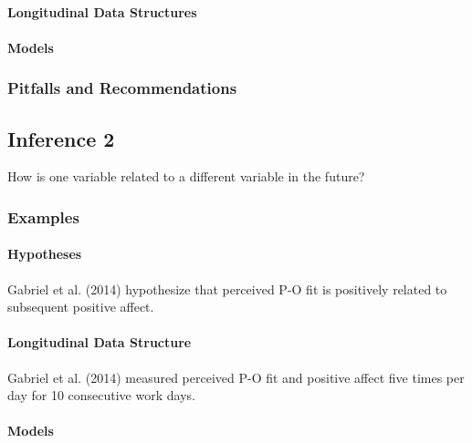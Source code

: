 \documentclass[english,,man]{apa6}
\let\oldparagraph\paragraph
\renewcommand{\paragraph}[1]{\oldparagraph{#1}\mbox{}}
\theoremstyle{definition}
\theoremstyle{definition}
\theoremstyle{definition}
\theoremstyle{remark}
\begin{document}
\hypertarget{longitudinal-data-structures-2}{%
\paragraph{Longitudinal Data
Structures}\label{longitudinal-data-structures-2}}

\hypertarget{models-7}{%
\paragraph{Models}\label{models-7}}

\hypertarget{pitfalls-and-recommendations-7}{%
\subsubsection{Pitfalls and
Recommendations}\label{pitfalls-and-recommendations-7}}

\hypertarget{inference-2-1}{%
\subsection{Inference 2}\label{inference-2-1}}

How is one variable related to a different variable in the future?

\hypertarget{examples-7}{%
\subsubsection{Examples}\label{examples-7}}

\hypertarget{hypotheses-8}{%
\paragraph{Hypotheses}\label{hypotheses-8}}

Gabriel et al. (2014) hypothesize that perceived P-O fit is positively
related to subsequent positive affect.

\hypertarget{longitudinal-data-structure-5}{%
\paragraph{Longitudinal Data
Structure}\label{longitudinal-data-structure-5}}

Gabriel et al. (2014) measured perceived P-O fit and positive affect
five times per day for 10 consecutive work days.

\hypertarget{models-8}{%
\paragraph{Models}\label{models-8}}
\end{document}
